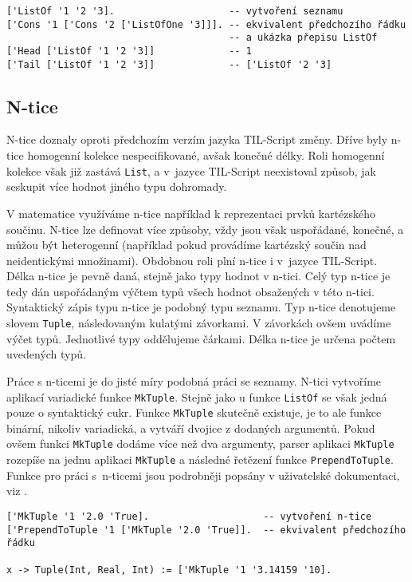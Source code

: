 \begin{lstlisting}[caption={Příklad využití seznamů}]
['ListOf '1 '2 '3].                    -- vytvoření seznamu
['Cons '1 ['Cons '2 ['ListOfOne '3]]]. -- ekvivalent předchozího řádku
                                       -- a ukázka přepisu ListOf
['Head ['ListOf '1 '2 '3]]             -- 1
['Tail ['ListOf '1 '2 '3]]             -- ['ListOf '2 '3]
\end{lstlisting}

\subsection{N-tice}

N-tice doznaly oproti předchozím verzím jazyka TIL-Script změny. Dříve byly n-tice homogenní kolekce
nespecifikované, avšak konečné délky. Roli homogenní kolekce však již zastává \lstinline{List}, a
v~jazyce TIL-Script neexistoval způsob, jak seskupit více hodnot jiného typu dohromady.

V matematice využíváme n-tice například k reprezentaci prvků kartézského součinu. N-tice lze
definovat více způsoby, vždy jsou však uspořádané, konečné, a můžou být heterogenní (například
pokud provádíme kartézský součin nad neidentickými množinami). Obdobnou roli plní n-tice i v~jazyce
TIL-Script. Délka n-tice je pevně daná, stejně jako typy hodnot v n-tici. Celý typ n-tice je
tedy dán uspořádaným výčtem typů všech hodnot obsažených v této n-tici. Syntaktický zápis
typu n-tice je podobný typu seznamu. Typ n-tice denotujeme slovem \lstinline{Tuple}, následovaným
kulatými závorkami. V závorkách ovšem uvádíme výčet typů. Jednotlivé typy oddělujeme čárkami. Délka
n-tice je určena počtem uvedených typů.

Práce s n-ticemi je do jisté míry podobná práci se seznamy. N-tici vytvoříme aplikací variadické
funkce \lstinline{MkTuple}. Stejně jako u funkce \lstinline{ListOf} se však jedná pouze o
syntaktický cukr. Funkce \lstinline{MkTuple} skutečně existuje, je to ale funkce binární, nikoliv
variadická, a vytváří dvojice z dodaných argumentů. Pokud ovšem funkci \lstinline{MkTuple} dodáme
více než dva argumenty, parser aplikaci \lstinline{MkTuple} rozepíše na jednu aplikaci
\lstinline{MkTuple} a následné řetězení funkce \lstinline{PrependToTuple}. Funkce pro práci
s~n-ticemi jsou podrobněji popsány v uživatelské dokumentaci, viz .
 
\begin{lstlisting}[caption={Příklad využití n-tic}]
['MkTuple '1 '2.0 'True].                    -- vytvoření n-tice
['PrependToTuple '1 ['MkTuple '2.0 'True]].  -- ekvivalent předchozího řádku

x -> Tuple(Int, Real, Int) := ['MkTuple '1 '3.14159 '10].
\end{lstlisting}


